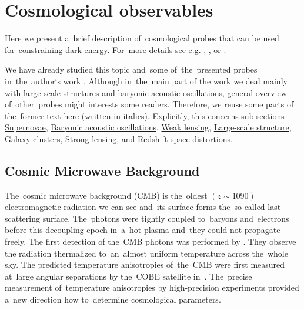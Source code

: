 \section{Cosmological observables}
Here we present a~brief description of~cosmological probes that can be used for~constraining dark energy. For~more details see e.g. \textcite{weinberg_observational_2013}, \textcite{2010deto.book.....A}, or \textcite{DE_probes2}.

We have already studied this topic and~some of~the~presented probes in~the~author`s work \textcite{mastersthesis_vrastil}. Although in~the~main part of the work we deal mainly with large-scale structures and baryonic acoustic oscillations, general overview of~other~probes might interests some readers. Therefore, we reuse some parts of the~former text here (written in italics). Explicitly, this concerns sub-sections \hyperref[ssec:supernovae]{Supernovae}, \hyperref[sec:bao]{Baryonic acoustic oscillations}, \hyperref[ssec:wl]{Weak lensing}, \hyperref[ssec:lss]{Large-scale structure}, \hyperref[ssec:gc]{Galaxy clusters}, \hyperref[ssec:SL]{Strong lensing}, and \hyperref[sec:rsd]{Redshift-space distortions}.



\subsection{Cosmic Microwave Background}
The~cosmic microwave background (CMB) is the~oldest $(z\sim1090)$ electromagnetic radiation we can see and~its surface forms the~so-called last scattering surface. The~photons were tightly coupled to~baryons and~electrons before this decoupling epoch in~a~hot plasma and~they could not propagate freely. The first detection of the~CMB photons was performed by \textcite{1965ApJ...142..419P}. They observe the radiation thermalized to~an~almost uniform temperature across the~whole sky. The predicted temperature anisotropies of~the~CMB were first measured at~large angular separations by the~COBE satellite in~\textcite{1992ApJ...396L...1S}. The~precise measurement of~temperature anisotropies by high-precision experiments \parencite[e.g.][]{2003ApJS..148..175S} provided a~new direction how to~determine cosmological parameters.

